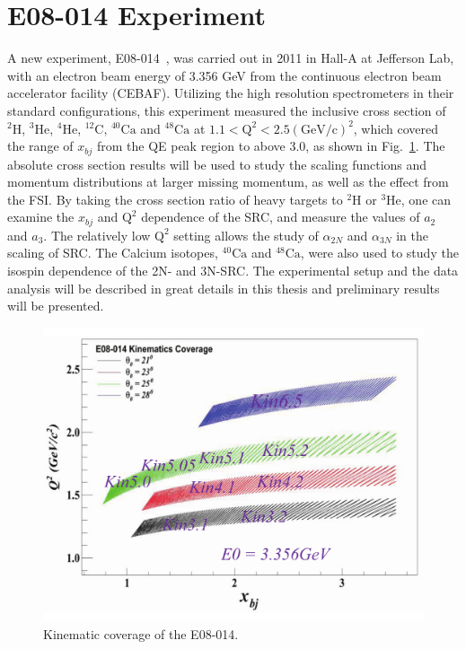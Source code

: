 \section{E08-014 Experiment}
 A new experiment, E08-014~\cite{e08014_pr}, was carried out in 2011 in Hall-A at Jefferson Lab, with an electron beam energy of 3.356 GeV from the continuous electron beam accelerator facility (CEBAF). Utilizing the high resolution spectrometers in their standard configurations, this experiment measured the inclusive cross section of $\mathrm{^{2}H}$, $\mathrm{^{3}He}$, $\mathrm{^{4}He}$, $\mathrm{^{12}C}$, $\mathrm{^{40}Ca}$ and $\mathrm{^{48}Ca}$ at $\mathrm{1.1<Q^{2}<2.5 (GeV/c)^{2}}$, which covered the range of $x_{bj}$ from the QE peak region to above 3.0, as shown in Fig.~\ref{kin_cor}. The absolute cross section results will be used to study the scaling functions and momentum distributions at larger missing momentum, as well as the effect from the FSI. By taking the cross section ratio of heavy targets to $\mathrm{^{2}H}$ or $\mathrm{^{3}He}$, one can examine the $x_{bj}$ and $\mathrm{Q^{2}}$ dependence of the SRC, and measure the values of $a_{2}$ and $a_{3}$. The relatively low $\mathrm{Q^{2}}$ setting allows the study of $\alpha_{2N}$ and $\alpha_{3N}$ in the scaling of SRC. The Calcium isotopes, $\mathrm{^{40}Ca}$ and $\mathrm{^{48}Ca}$, were also used to study the isospin dependence of the 2N- and 3N-SRC. The experimental setup and the data analysis will be described in great details in this thesis and preliminary results will be presented. 
\begin{figure}[!ht]
  \begin{center}
    \includegraphics[type=pdf,ext=.pdf,read=.pdf,width=0.70\linewidth]{./figures/physics/E08014_Kin_Cover}
    \caption[Kinematic coverage of the E08-014]{\footnotesize{Kinematic coverage of the E08-014.}}
    \label{kin_cor}
  \end{center}
\end{figure}

